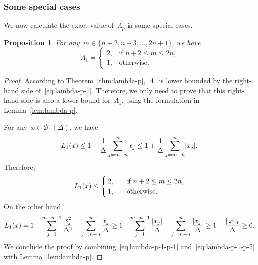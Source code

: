 \documentclass[draft]{article}
\numberwithin{equation}{section}
\theoremstyle{definition}
\theoremstyle{plain}
\newtheorem{proposition}{Proposition}[section]
\newcommand{\abs}[2][]{#1\lvert#2#1\rvert}
\newcommand{\lagp}[1][]{L\ifblank{#1}{}{_{#1}}}
\newcommand{\norm}[2][]{#1\lVert#2#1\rVert}
\newcommand{\set}[2][]{#1\{#2#1\}}
\begin{document}
\subsubsection{Some special cases}

We now calculate the exact value of~$\Lambda_p$ in some special cases.

\begin{proposition}
    \label{prop:lambda-p-1}
    For any~$m \in \set{n + 2, n + 3, \dots, 2n + 1}$, we have
    \begin{equation}
        \label{eq:lambda-p-1}
        \Lambda_1 =
        \begin{cases}
            2,  & \text{if~$n + 2 \le m \le 2n$,}\\
            1,  & \text{otherwise.}
        \end{cases}
    \end{equation}
\end{proposition}

\begin{proof}
    According to Theorem~\ref{thm:lambda-p},~$\Lambda_1$ is lower bounded by the right-hand side of~\eqref{eq:lambda-p-1}.
    Therefore, we only need to prove that this right-hand side is also a lower bound for~$\Lambda_1$, using the formulation in Lemma~\ref{lem:lambda-p}.

    For any~$x \in \mathcal{B}_1(\Delta)$, we have
    \begin{equation*}
        \lagp[1](x) \le 1 - \frac{1}{\Delta} \sum_{j = m - n}^n x_j \le 1 + \frac{1}{\Delta} \sum_{j = m - n}^n \abs{x_j}.
    \end{equation*}
    Therefore,
    \begin{equation}
        \label{eq:lambda-p-1-p-1}
        \lagp[1](x) \le
        \begin{cases}
            2,  & \quad \text{if~$n + 2 \le m \le 2n$,}\\
            1,  & \quad \text{otherwise.}
        \end{cases}
    \end{equation}
    On the other hand,
    \begin{equation}
        \label{eq:lambda-p-1-p-2}
        \lagp[1](x) = 1 - \sum_{j = 1}^{m - n - 1} \frac{x_j^2}{\Delta^2} - \sum_{j = m - n}^n \frac{x_j}{\Delta} \ge 1 - \sum_{j = 1}^{m - n - 1} \frac{\abs{x_j}}{\Delta} - \sum_{j = m - n}^n \frac{\abs{x_j}}{\Delta} \ge 1 - \frac{\norm{x}_1}{\Delta} \ge 0.
    \end{equation}
    We conclude the proof by combining~\eqref{eq:lambda-p-1-p-1} and~\eqref{eq:lambda-p-1-p-2} with Lemma~\ref{lem:lambda-p}.
\end{proof}
\end{document}
